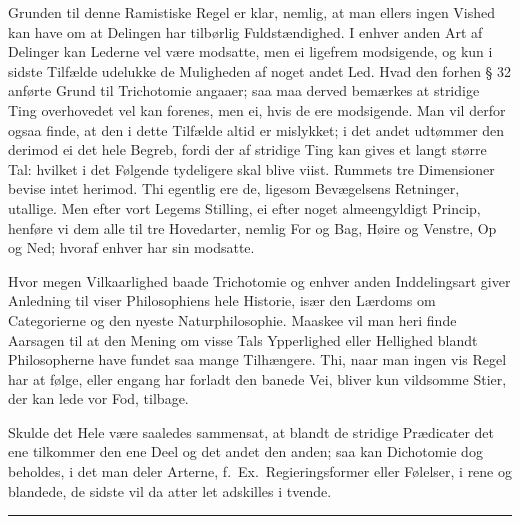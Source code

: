 \documentclass[12pt,a4paper]{article}
\newcommand{\opage}[1]{\marginnote{\footnotesize\textit{[#1]}}}
\begin{document}
Grunden til denne Ramistiske Regel er klar, nemlig, at man ellers ingen Vished
kan have om at Delingen har tilbørlig Fuldstændighed. I enhver anden Art af
Delinger kan Lederne vel være modsatte, men ei ligefrem modsigende, og kun i
sidste Tilfælde udelukke de Muligheden af noget andet Led. Hvad den forhen § 32
anførte Grund til Trichotomie angaaer; saa maa derved bemærkes at stridige Ting
overhovedet vel kan forenes, men ei, hvis de ere modsigende. Man vil derfor
ogsaa finde, at den i dette Tilfælde altid er mislykket; i det andet udtømmer
den derimod ei det hele Begreb, fordi der af stridige Ting kan gives et langt
større Tal: hvilket i det Følgende tydeligere skal blive viist.
\opage{108} Rummets tre Dimensioner bevise intet herimod. Thi egentlig ere de, ligesom
Bevægelsens Retninger, utallige. Men efter vort Legems Stilling, ei efter noget
almeengyldigt Princip, henføre vi dem alle til tre Hovedarter, nemlig For og
Bag, Høire og Venstre, Op og Ned; hvoraf enhver har sin modsatte.

Hvor megen Vilkaarlighed baade Trichotomie og enhver anden Inddelingsart giver
Anledning til viser Philosophiens hele Historie, især den Lærdoms om
Categorierne og den nyeste Naturphilosophie. Maaskee vil man heri finde
Aarsagen til at den Mening om visse Tals Ypperlighed eller Hellighed blandt
Philosopherne have fundet saa mange Tilhængere. Thi, naar man ingen vis Regel
har at følge, eller engang har forladt den banede Vei, bliver kun vildsomme
Stier, der kan lede vor Fod, tilbage.

Skulde det Hele være saaledes sammensat, at blandt de stridige Prædicater det
ene tilkommer den ene Deel og det andet den anden; saa kan Dichotomie dog
beholdes, i det man deler Arterne, f.~Ex.\ Regieringsformer eller Følelser, i
rene og blandede, de sidste vil da atter let adskilles i tvende.


\begin{center}\rule{0.25\linewidth}{0.4pt}\end{center}
\end{document}
